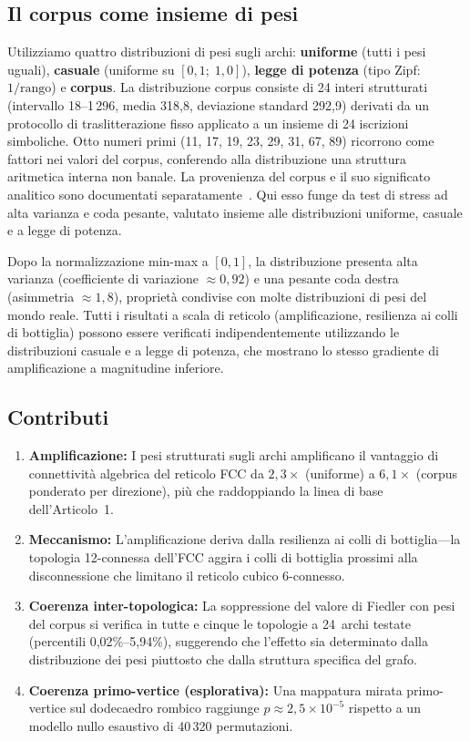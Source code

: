 \documentclass[11pt]{article}
\begin{document}
\subsection{Il corpus come insieme di pesi}
\label{sec:corpus}

Utilizziamo quattro distribuzioni di pesi sugli archi: \textbf{uniforme}
(tutti i pesi uguali), \textbf{casuale} (uniforme su $[0{,}1;\; 1{,}0]$),
\textbf{legge di potenza} (tipo Zipf: $1/\text{rango}$) e
\textbf{corpus}. La distribuzione corpus consiste di 24 interi
strutturati (intervallo 18--1\,296, media 318,8, deviazione standard
292,9) derivati da un protocollo di traslitterazione fisso applicato a
un insieme di 24 iscrizioni simboliche. Otto numeri primi
(11, 17, 19, 23, 29, 31, 67, 89) ricorrono come fattori nei valori
del corpus, conferendo alla distribuzione una struttura aritmetica
interna non banale. La provenienza del corpus e il suo significato
analitico sono documentati
separatamente~\cite{bielec2026shape}. Qui esso funge da test di stress
ad alta varianza e coda pesante, valutato insieme alle distribuzioni
uniforme, casuale e a legge di potenza.

Dopo la normalizzazione min-max a $[0,1]$, la distribuzione presenta
alta varianza (coefficiente di variazione $\approx 0{,}92$) e una
pesante coda destra (asimmetria $\approx 1{,}8$), propriet\`a condivise
con molte distribuzioni di pesi del mondo reale. Tutti i risultati a
scala di reticolo (amplificazione, resilienza ai colli di bottiglia)
possono essere verificati indipendentemente utilizzando le distribuzioni
casuale e a legge di potenza, che mostrano lo stesso gradiente di
amplificazione a magnitudine inferiore.

\subsection{Contributi}

\begin{enumerate}
  \item \textbf{Amplificazione:} I pesi strutturati sugli archi
    amplificano il vantaggio di connettivit\`a algebrica del reticolo
    FCC da $2{,}3\times$ (uniforme) a $6{,}1\times$ (corpus ponderato
    per direzione), pi\`u che raddoppiando la linea di base
    dell'Articolo~1.
  \item \textbf{Meccanismo:} L'amplificazione deriva dalla resilienza
    ai colli di bottiglia---la topologia 12-connessa dell'FCC aggira i
    colli di bottiglia prossimi alla disconnessione che limitano il
    reticolo cubico 6-connesso.
  \item \textbf{Coerenza inter-topologica:} La soppressione del valore
    di Fiedler con pesi del corpus si verifica in tutte e cinque le
    topologie a 24~archi testate (percentili 0,02\%--5,94\%),
    suggerendo che l'effetto sia determinato dalla distribuzione dei
    pesi piuttosto che dalla struttura specifica del grafo.
  \item \textbf{Coerenza primo-vertice (esplorativa):} Una mappatura
    mirata primo-vertice sul dodecaedro rombico raggiunge
    $p \approx 2{,}5 \times 10^{-5}$ rispetto a un modello nullo
    esaustivo di 40\,320 permutazioni.
\end{enumerate}
\end{document}
